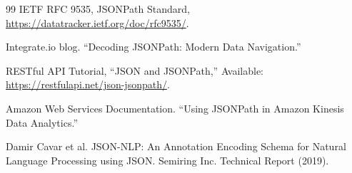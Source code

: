 \documentclass[12pt,a4paper]{report}
\begin{document}
\begin{thebibliography}{99}
		IETF RFC 9535, JSONPath Standard, \url{https://datatracker.ietf.org/doc/rfc9535/}.
		
		Integrate.io blog. “Decoding JSONPath: Modern Data Navigation.”  
		
		RESTful API Tutorial, ``JSON and JSONPath,'' Available: \url{https://restfulapi.net/json-jsonpath/}.
		
		Amazon Web Services Documentation. “Using JSONPath in Amazon Kinesis Data Analytics.”  
		
		Damir Cavar et al. JSON-NLP: An Annotation Encoding Schema for Natural Language Processing using JSON. Semiring Inc. Technical Report (2019).
		
	\end{thebibliography}
	
	
\end{document}
